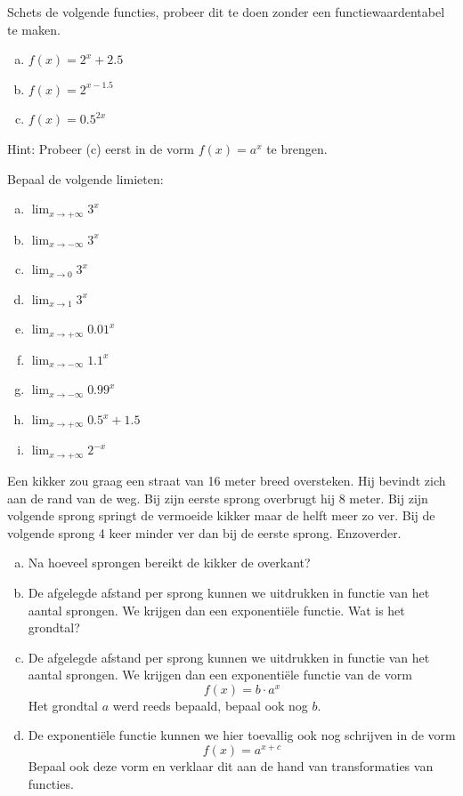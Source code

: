 \documentclass[12pt,twoside,a4paper]{article}
\begin{document}
\begin{oefening}
Schets de volgende functies, probeer dit te doen zonder een functiewaardentabel te maken.
\begin{multicols}{3}
\begin{enumerate}[(a)]
  \item $f(x)=2^x+2.5$
  \item $f(x)=2^{x-1.5}$
  \item $f(x)=0.5^{2x}$
\end{enumerate}
\end{multicols}
Hint: Probeer (c) eerst in de vorm $f(x)=a^x$ te brengen.
\end{oefening}

\begin{oefening}
Bepaal de volgende limieten:
\begin{multicols}{3}
\begin{enumerate}[(a)]
  \itemsep1em
  \item $\displaystyle\lim_{x\to+\infty}3^x$
  \item $\displaystyle\lim_{x\to-\infty}3^x$
  \item $\displaystyle\lim_{x\to0}3^x$
  \item $\displaystyle\lim_{x\to1}3^x$
  \item $\displaystyle\lim_{x\to+\infty}0.01^x$
  \item $\displaystyle\lim_{x\to-\infty}1.1^x$
  \item $\displaystyle\lim_{x\to-\infty}0.99^x$
  \item $\displaystyle\lim_{x\to+\infty}0.5^x+1.5$
  \item $\displaystyle\lim_{x\to+\infty}2^{-x}$
\end{enumerate}
\end{multicols}
\end{oefening}

\begin{oefening}
  Een kikker zou graag een straat van 16 meter breed oversteken. Hij bevindt zich aan de rand van de weg. Bij zijn eerste sprong overbrugt hij 8 meter. Bij zijn volgende sprong springt de vermoeide kikker maar de helft meer zo ver. Bij de volgende sprong 4 keer minder ver dan bij de eerste sprong. Enzoverder.
  \begin{enumerate}[(a)]
  \item Na hoeveel sprongen bereikt de kikker de overkant?
  \item De afgelegde afstand per sprong kunnen we uitdrukken in functie van het aantal sprongen. We krijgen dan een exponentiële functie. Wat is het grondtal?
  \item De afgelegde afstand per sprong kunnen we uitdrukken in functie van het aantal sprongen. We krijgen dan een exponentiële functie van de vorm
    $$f(x)=b\cdot a^x$$
    Het grondtal $a$ werd reeds bepaald, bepaal ook nog $b$.
  \item De exponentiële functie kunnen we hier toevallig ook nog schrijven in de vorm
    $$f(x)=a^{x+c}$$
    Bepaal ook deze vorm en verklaar dit aan de hand van transformaties van functies.
  \end{enumerate}
\end{oefening}
\end{document}
